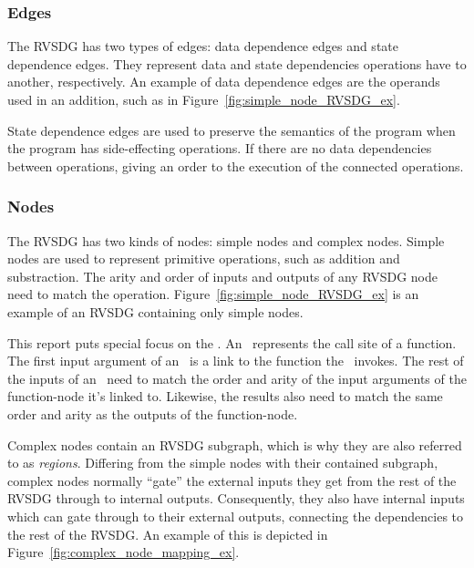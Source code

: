\subsubsection{Edges}

The RVSDG has two types of edges: data dependence edges and state dependence
edges. They represent data and state dependencies operations have to another,
respectively. An example of data dependence edges are the operands used in an
addition, such as in Figure~\ref{fig:simple_node_RVSDG_ex}.

State dependence edges are used to preserve the semantics of the program when
the program has side-effecting operations. If there are no data dependencies
between operations, giving an order to the execution of the connected
operations.

\subsubsection{Nodes}

The RVSDG has two kinds of nodes: simple nodes and complex nodes. Simple nodes
are used to represent primitive operations, such as addition and substraction.
The arity and order of inputs and outputs of any RVSDG node need to match the
operation. Figure~\ref{fig:simple_node_RVSDG_ex} is an example of an RVSDG
containing only simple nodes.

This report puts special focus on the \applyNode . An \applyNode~represents the
call site of a function. The first input argument of an \applyNode~is a link to
the function the \applyNode~invokes. The rest of the inputs of an
\applyNode~need to match the order and arity of the input arguments of the
function-node it's linked to. Likewise, the results also need to match the same
order and arity as the outputs of the function-node.

Complex nodes contain an RVSDG subgraph, which is why they are also referred to
as \textit{regions}. Differing from the simple nodes with their contained
subgraph, complex nodes normally ``gate'' the external inputs they get from the
rest of the RVSDG through to internal outputs. Consequently, they also have
internal inputs which can gate through to their external outputs, connecting the
dependencies to the rest of the RVSDG. An example of this is depicted in
Figure~\ref{fig:complex_node_mapping_ex}.

